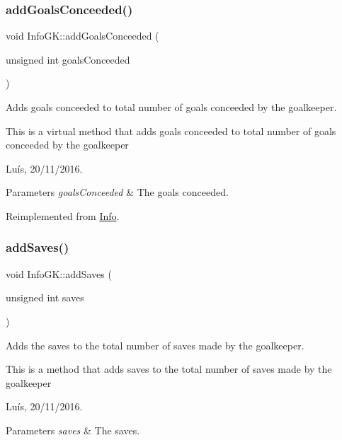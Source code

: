 \subsubsection{\texorpdfstring{add\+Goals\+Conceeded()}{addGoalsConceeded()}}
{\footnotesize\ttfamily void Info\+G\+K\+::add\+Goals\+Conceeded (\begin{DoxyParamCaption}\item[{unsigned int}]{goals\+Conceeded }\end{DoxyParamCaption})\hspace{0.3cm}{\ttfamily [virtual]}}



Adds goals conceeded to total number of goals conceeded by the goalkeeper. 

This is a virtual method that adds goals conceeded to total number of goals conceeded by the goalkeeper

Luís, 20/11/2016. 


\begin{DoxyParams}{Parameters}
{\em goals\+Conceeded} & The goals conceeded. \\
\hline
\end{DoxyParams}


Reimplemented from \hyperlink{class_info_ae252f25a8dff58017b92ba7a5ad02bc0}{Info}.

\hypertarget{class_info_g_k_aa1535598fa29b199374a404dda8b73f2}{}\label{class_info_g_k_aa1535598fa29b199374a404dda8b73f2} 
\subsubsection{\texorpdfstring{add\+Saves()}{addSaves()}}
{\footnotesize\ttfamily void Info\+G\+K\+::add\+Saves (\begin{DoxyParamCaption}\item[{unsigned int}]{saves }\end{DoxyParamCaption})\hspace{0.3cm}{\ttfamily [virtual]}}



Adds the saves to the total number of saves made by the goalkeeper. 

This is a method that adds saves to the total number of saves made by the goalkeeper

Luís, 20/11/2016. 


\begin{DoxyParams}{Parameters}
{\em saves} & The saves. \\
\hline
\end{DoxyParams}


